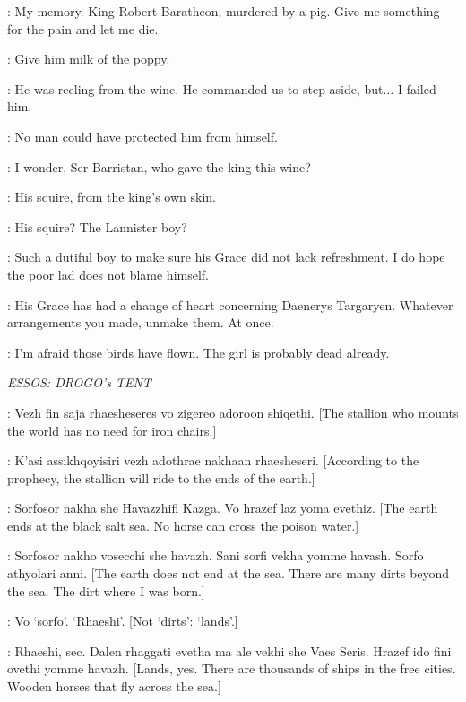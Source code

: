 \ROBERT: My memory. King Robert Baratheon, murdered by a pig. Give me something for the pain and let me die. 


\NED: Give him milk of the poppy. 

\SELMY: He was reeling from the wine. He commanded us to step aside, but$\ldots$ I failed him. 

\NED: No man could have protected him from himself. 

\VARYS: I wonder, Ser Barristan, who gave the king this wine? 

\SELMY: His squire, from the king's own skin. 

\NED: His squire? The Lannister boy? 

\VARYS: Such a dutiful boy to make sure his Grace did not lack refreshment. I do hope the poor lad does not blame himself. 

\NED: His Grace has had a change of heart concerning Daenerys Targaryen. Whatever arrangements you made, unmake them. At once. 

\VARYS: I'm afraid those birds have flown. The girl is probably dead already. 


\scene

\textit{ESSOS: DROGO's TENT} 


\DROGO: Vezh fin saja rhaesheseres vo zigereo adoroon shiqethi. [The stallion who mounts the world has no need for iron chairs.] 

\DAENERYS: K'asi assikhqoyisiri vezh adothrae nakhaan rhaesheseri. [According to the prophecy, the stallion will ride to the ends of the earth.] 

\DROGO: Sorfosor nakha she Havazzhifi Kazga. Vo hrazef laz yoma evethiz. [The earth ends at the black salt sea. No horse can cross the poison water.] 

\DAENERYS: Sorfosor nakho vosecchi she havazh. Sani sorfi vekha yomme havash. Sorfo athyolari anni. [The earth does not end at the sea. There are many dirts beyond the sea. The dirt where I was born.] 

\DROGO: Vo `sorfo'. `Rhaeshi'. [Not `dirts': `lands'.] 

\DAENERYS: Rhaeshi, sec. Dalen rhaggati evetha ma ale vekhi she Vaes Seris. Hrazef ido fini ovethi yomme havazh. [Lands, yes. There are thousands of ships in the free cities. Wooden horses that fly across the sea.] 

